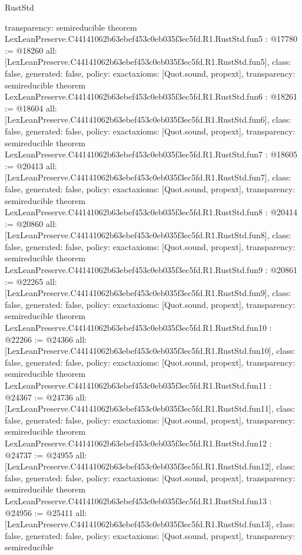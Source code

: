 \begin{lexlean}{RustStd}
\begin{coremodule}
{  transparency: semireducible
}
theorem LexLeanPreserve.C44141062b63ebef453c0eb035f3ec5fd.R1.RustStd.fun5 : @17780 := @18260 {
  all: [LexLeanPreserve.C44141062b63ebef453c0eb035f3ec5fd.R1.RustStd.fun5],
  class: false,
  generated: false,
  policy: exact{axioms: [Quot.sound, propext]},
  transparency: semireducible
}
theorem LexLeanPreserve.C44141062b63ebef453c0eb035f3ec5fd.R1.RustStd.fun6 : @18261 := @18604 {
  all: [LexLeanPreserve.C44141062b63ebef453c0eb035f3ec5fd.R1.RustStd.fun6],
  class: false,
  generated: false,
  policy: exact{axioms: [Quot.sound, propext]},
  transparency: semireducible
}
theorem LexLeanPreserve.C44141062b63ebef453c0eb035f3ec5fd.R1.RustStd.fun7 : @18605 := @20413 {
  all: [LexLeanPreserve.C44141062b63ebef453c0eb035f3ec5fd.R1.RustStd.fun7],
  class: false,
  generated: false,
  policy: exact{axioms: [Quot.sound, propext]},
  transparency: semireducible
}
theorem LexLeanPreserve.C44141062b63ebef453c0eb035f3ec5fd.R1.RustStd.fun8 : @20414 := @20860 {
  all: [LexLeanPreserve.C44141062b63ebef453c0eb035f3ec5fd.R1.RustStd.fun8],
  class: false,
  generated: false,
  policy: exact{axioms: [Quot.sound, propext]},
  transparency: semireducible
}
theorem LexLeanPreserve.C44141062b63ebef453c0eb035f3ec5fd.R1.RustStd.fun9 : @20861 := @22265 {
  all: [LexLeanPreserve.C44141062b63ebef453c0eb035f3ec5fd.R1.RustStd.fun9],
  class: false,
  generated: false,
  policy: exact{axioms: [Quot.sound, propext]},
  transparency: semireducible
}
theorem LexLeanPreserve.C44141062b63ebef453c0eb035f3ec5fd.R1.RustStd.fun10 : @22266 := @24366 {
  all: [LexLeanPreserve.C44141062b63ebef453c0eb035f3ec5fd.R1.RustStd.fun10],
  class: false,
  generated: false,
  policy: exact{axioms: [Quot.sound, propext]},
  transparency: semireducible
}
theorem LexLeanPreserve.C44141062b63ebef453c0eb035f3ec5fd.R1.RustStd.fun11 : @24367 := @24736 {
  all: [LexLeanPreserve.C44141062b63ebef453c0eb035f3ec5fd.R1.RustStd.fun11],
  class: false,
  generated: false,
  policy: exact{axioms: [Quot.sound, propext]},
  transparency: semireducible
}
theorem LexLeanPreserve.C44141062b63ebef453c0eb035f3ec5fd.R1.RustStd.fun12 : @24737 := @24955 {
  all: [LexLeanPreserve.C44141062b63ebef453c0eb035f3ec5fd.R1.RustStd.fun12],
  class: false,
  generated: false,
  policy: exact{axioms: [Quot.sound, propext]},
  transparency: semireducible
}
theorem LexLeanPreserve.C44141062b63ebef453c0eb035f3ec5fd.R1.RustStd.fun13 : @24956 := @25411 {
  all: [LexLeanPreserve.C44141062b63ebef453c0eb035f3ec5fd.R1.RustStd.fun13],
  class: false,
  generated: false,
  policy: exact{axioms: [Quot.sound, propext]},
  transparency: semireducible
}
\end{coremodule}
\end{lexlean}
